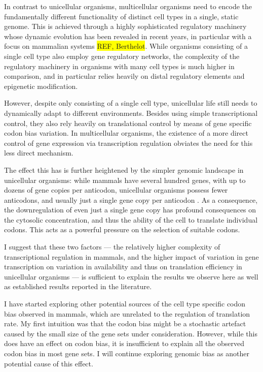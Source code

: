 In contrast to unicellular organisms, multicellular organisms need to encode the
fundamentally different functionality of distinct cell types in a single, static
genome. This is achieved through a highly sophisticated regulatory machinery
whose dynamic evolution has been revealed in recent years, in particular with a
focus on mammalian systems \colorbox{yellow}{REF, Berthelot}. While  organisms
consisting of a single cell type also employ gene regulatory networks, the
complexity of the regulatory machinery in organisms with many cell types is much
higher in comparison, and in particular relies heavily on distal regulatory
elements and epigenetic modification.

However, despite only consisting of a single cell type, unicellular life still
needs to dynamically adapt to different environments. Besides using simple
transcriptional control, they also rely heavily on translational control by
means of gene specific codon bias variation. In multicellular organisms, the
existence of a more direct control of gene expression via transcription
regulation obviates the need for this less direct mechanism.

The effect this has is further heightened by the simpler genomic \trna landscape
in unicellular organisms: while mammals have several hundred \trna genes, with
up to dozens of gene copies per anticodon, unicellular organisms possess fewer
anticodons, and usually just a single \trna gene copy per anticodon
\citep{Chan:2009}. As a consequence, the downregulation of even just a single
\trna gene copy has profound consequences on the cytosolic \trna concentration,
and thus the ability of the cell to translate individual codons. This acts as a
powerful pressure on the selection of suitable codons.

I suggest that these two factors — the relatively higher complexity of
transcriptional regulation in mammals, and the higher impact of variation in
\trna gene transcription on variation in
\trna availability and thus on translation efficiency in unicellular organisms —
is sufficient to explain the results we observe here as well as established
results reported in the literature.


I have started exploring other potential sources of the cell type specific codon
bias observed in mammals, which are unrelated to the regulation of translation
rate. My first intuition was that the codon bias might be a stochastic artefact
caused by the small size of the gene sets under consideration. However, while
this does have an effect on codon bias, it is insufficient to explain all the
observed codon bias in most gene sets. I will continue exploring genomic \gc
bias as another potential cause of this effect.

